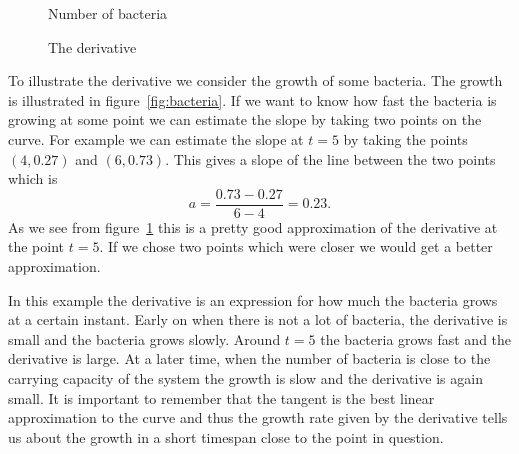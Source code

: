 \documentclass[main.tex]{subfiles}
\begin{document}
\begin{figure}
\begin{center}
\begin{minipage}[t]{0.45\linewidth}
\caption{Number of bacteria} \label{fig:bacteria}
\end{minipage}
\begin{minipage}[t]{0.45\linewidth}
\caption{The derivative} \label{fig:bacteriaDerivative}
\end{minipage}
\end{center}
\end{figure}

To illustrate the derivative we consider the growth of some bacteria. The growth is illustrated in figure~\ref{fig:bacteria}. If we want to know how fast the bacteria is growing at some point we can estimate the slope by taking two points on the curve. For example we can estimate the slope at $t = 5$ by taking the points $(4, 0.27)$ and $(6, 0.73)$. This gives a slope of the line between the two points which is
\begin{equation}
a = \frac{0.73 - 0.27}{6 - 4} = 0.23.
\end{equation}
As we see from figure~\ref{fig:bacteriaDerivative} this is a pretty good approximation of the derivative at the point $t = 5$. If we chose two points which were closer we would get a better approximation.

In this example the derivative is an expression for how much the bacteria grows at a certain instant. Early on when there is not a lot of bacteria, the derivative is small and the bacteria grows slowly. Around $t = 5$ the bacteria grows fast and the derivative is large. At a later time, when the number of bacteria is close to the carrying capacity of the system the growth is slow and the derivative is again small. It is important to remember that the tangent is the best linear approximation to the curve and thus the growth rate given by the derivative tells us about the growth in a short timespan close to the point in question.
\end{document}
